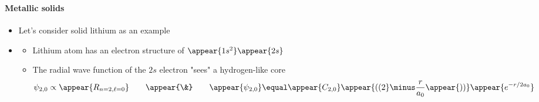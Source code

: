 \begin{frame}
\frametitle{\texorpdfstring{\culine[\sectiontitleulinecolor]{\sectiontitle}}{\sectiontitle} }
\framesubtitle{Metallic solids}

\begin{itemize}
	\item Let's consider solid lithium as an example

\item[] \begin{itemize}
	\item Lithium atom has an electron structure of $\appear{1 s^{2}} \appear{2 s}$ 

\item The radial wave function of the $2 s$ electron "sees" a hydrogen-like core 
\[ 
 \psi_{2,0} \propto \appear{R_{n=2, \ell=0}} \qquad \appear{\&} \qquad \appear{\psi_{2,0}} \equal \appear{C_{2,0}} \appear{\textrm{((}2} \minus \frac{r}{a_{0}} \appear{\textrm{))} }\appear{e^{-r / 2 a_{0}} }
 \]
 

\end{itemize}

\end{itemize}

\endofslide 
\end{frame}

